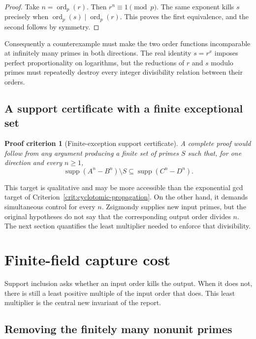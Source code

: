 \documentclass[11pt,oneside]{article}
\newtheorem{criterion}[theorem]{Proof criterion}
\theoremstyle{definition}
\theoremstyle{remark}
\newcommand{\ord}{\operatorname{ord}}
\newcommand{\supp}{\operatorname{supp}}
\begin{document}
\begin{proof}
Take $n=\ord_p(r)$.  Then $r^n\equiv1\pmod p$.  The same exponent kills $s$ precisely
when $\ord_p(s)\mid\ord_p(r)$.  This proves the first equivalence, and the second follows by
symmetry.
\end{proof}

Consequently a counterexample must make the two order functions incomparable at infinitely
many primes in both directions.  The real identity $s=r^x$ imposes perfect proportionality
on logarithms, but the reductions of $r$ and $s$ modulo primes must repeatedly destroy every
integer divisibility relation between their orders.

\subsection{A support certificate with a finite exceptional set}

\begin{criterion}[Finite-exception support certificate]
\label{crit:support-certificate}
A complete proof would follow from any argument producing a finite set of primes $S$ such
that, for one direction and every $n\ge1$,
\[
 \supp(A^n-B^n)\setminus S
 \subseteq \supp(C^n-D^n).
\]
\end{criterion}

This target is qualitative and may be more accessible than the exponential gcd target of
Criterion~\ref{crit:cyclotomic-propagation}.  On the other hand, it demands simultaneous
control for every $n$.  Zsigmondy supplies new input primes, but the original hypotheses do
not say that the corresponding output order divides $n$.  The next section quantifies the
least multiplier needed to enforce that divisibility.

\section{Finite-field capture cost}
\label{sec:capture}

Support inclusion asks whether an input order kills the output.  When it does not, there is
still a least positive multiple of the input order that does.  This least multiplier is the
central new invariant of the report.

\subsection{Removing the finitely many nonunit primes}
\end{document}
